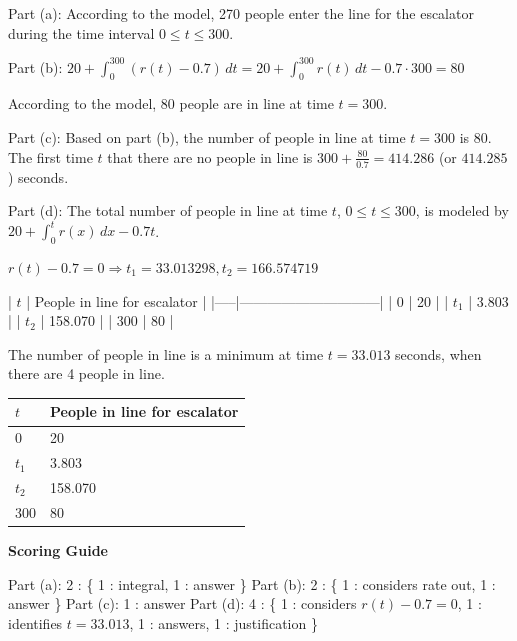 \documentclass[12pt,addpoints,answers]{exam}
\begin{document}
\begin{questions}
\begin{solution}
Part (a): According to the model, 270 people enter the line for the escalator during the time interval $0 \le t \le 300$. \par Part (b): $20 + \int_0^{300} (r(t) - 0.7) \, dt = 20 + \int_0^{300} r(t) \, dt - 0.7 \cdot 300 = 80$ \par According to the model, 80 people are in line at time $t = 300$. \par Part (c): Based on part (b), the number of people in line at time $t = 300$ is 80. The first time $t$ that there are no people in line is $300 + \frac{80}{0.7} = 414.286$ (or $414.285$) seconds. \par Part (d): The total number of people in line at time $t$, $0 \le t \le 300$, is modeled by $20 + \int_0^t r(x) \, dx - 0.7t$. \par $r(t) - 0.7 = 0 \Rightarrow t_1 = 33.013298, t_2 = 166.574719$ \par | $t$ | People in line for escalator | |-----|------------------------------| | 0 | 20 | | $t_1$ | 3.803 | | $t_2$ | 158.070 | | 300 | 80 | \par The number of people in line is a minimum at time $t = 33.013$ seconds, when there are 4 people in line.
\begin{center}
\begin{tabular}{|l|l|}
\hline
$t$ & People in line for escalator \\
\hline
0 & 20 \\
\hline
$t_1$ & 3.803 \\
\hline
$t_2$ & 158.070 \\
\hline
300 & 80 \\
\hline
\end{tabular}
\end{center}
\par\medskip
\textbf{Scoring Guide}\par
Part (a): 2 : \{ 1 : integral, 1 : answer \} Part (b): 2 : \{ 1 : considers rate out, 1 : answer \} Part (c): 1 : answer Part (d): 4 : \{ 1 : considers $r(t) - 0.7 = 0$, 1 : identifies $t = 33.013$, 1 : answers, 1 : justification \}
\end{solution}


\end{questions}
\end{document}

